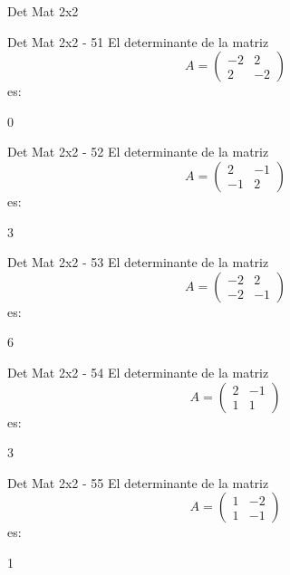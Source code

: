 \documentclass[a4,11pt]{aleph-notas}
\begin{document}
\begin{quiz}{Det Mat 2x2}
\begin{numerical}[tolerance=0]%
    {Det Mat 2x2 - 51}
    El determinante de la matriz
    \[
        A = \begin{pmatrix} -2 & 2 \\ 2 & -2 \end{pmatrix}
    \]
    es:
    \item[] 0
\end{numerical}

\begin{numerical}[tolerance=0]%
    {Det Mat 2x2 - 52}
    El determinante de la matriz
    \[
        A = \begin{pmatrix} 2 & -1 \\ -1 & 2 \end{pmatrix}
    \]
    es:
    \item[] 3
\end{numerical}

\begin{numerical}[tolerance=0]%
    {Det Mat 2x2 - 53}
    El determinante de la matriz
    \[
        A = \begin{pmatrix} -2 & 2 \\ -2 & -1 \end{pmatrix}
    \]
    es:
    \item[] 6
\end{numerical}

\begin{numerical}[tolerance=0]%
    {Det Mat 2x2 - 54}
    El determinante de la matriz
    \[
        A = \begin{pmatrix} 2 & -1 \\ 1 & 1 \end{pmatrix}
    \]
    es:
    \item[] 3
\end{numerical}

\begin{numerical}[tolerance=0]%
    {Det Mat 2x2 - 55}
    El determinante de la matriz
    \[
        A = \begin{pmatrix} 1 & -2 \\ 1 & -1 \end{pmatrix}
    \]
    es:
    \item[] 1
\end{numerical}


\end{quiz}
\end{document}
